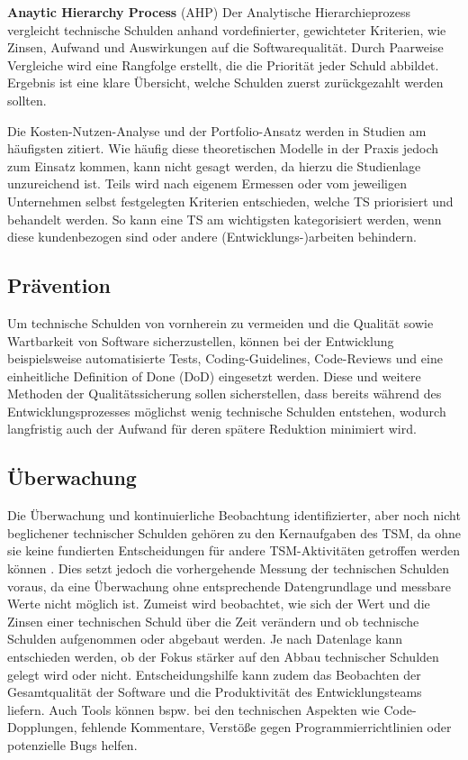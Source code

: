 \documentclass[acmtog]{acmart}
\begin{document}
\textbf{Anaytic Hierarchy Process} (AHP)
Der Analytische Hierarchieprozess vergleicht technische Schulden anhand
vordefinierter, gewichteter Kriterien, wie Zinsen, Aufwand und Auswirkungen
auf die Softwarequalität. Durch Paarweise Vergleiche wird eine Rangfolge
erstellt, die die Priorität jeder Schuld abbildet. Ergebnis ist eine klare
Übersicht, welche Schulden zuerst zurückgezahlt werden sollten. \cite{Seaman12, Alves16}


Die Kosten-Nutzen-Analyse und der Portfolio-Ansatz werden in Studien am
häufigsten zitiert. Wie häufig diese theoretischen Modelle in der Praxis jedoch
zum Einsatz kommen, kann nicht gesagt werden, da hierzu die Studienlage
unzureichend ist. \cite{Seaman12} Teils wird nach eigenem Ermessen oder vom
jeweiligen Unternehmen selbst festgelegten Kriterien entschieden, welche TS
priorisiert und behandelt werden. So kann eine TS am wichtigsten kategorisiert
werden, wenn diese kundenbezogen sind oder andere (Entwicklungs-)arbeiten
behindern. \cite{Codabux13}

\subsection{Prävention}\label{sec:TSM_Prävention}
Um technische Schulden von vornherein zu vermeiden und die Qualität sowie
Wartbarkeit von Software sicherzustellen, können bei der Entwicklung
beispielsweise automatisierte Tests, Coding-Guidelines, Code-Reviews und
eine einheitliche Definition of Done (DoD) eingesetzt werden. Diese und
weitere Methoden der Qualitätssicherung sollen sicherstellen, dass bereits
während des Entwicklungsprozesses möglichst wenig technische Schulden
entstehen, wodurch langfristig auch der Aufwand für deren spätere Reduktion
minimiert wird. \cite{Behutiye17, Holvitie18, Alves16}

\subsection{Überwachung}\label{sec:TSM_Überwachung}
Die Überwachung und kontinuierliche Beobachtung identifizierter, aber noch
nicht beglichener technischer Schulden gehören zu den Kernaufgaben des TSM,
da ohne sie keine fundierten Entscheidungen für andere TSM-Aktivitäten getroffen
werden können \cite{Ernst15}. Dies setzt jedoch die vorhergehende Messung der
technischen Schulden voraus, da eine Überwachung ohne entsprechende Datengrundlage
und messbare Werte nicht möglich ist. \cite{Alves16} Zumeist wird beobachtet,
wie sich der Wert und die Zinsen einer technischen Schuld über die Zeit verändern
und ob technische Schulden aufgenommen oder abgebaut werden. Je nach Datenlage
kann entschieden werden, ob der Fokus stärker auf den Abbau technischer Schulden
gelegt wird oder nicht. Entscheidungshilfe kann zudem das Beobachten der
Gesamtqualität der Software und die Produktivität des Entwicklungsteams liefern.
Auch Tools können bspw. bei den technischen Aspekten wie Code-Dopplungen,
fehlende Kommentare, Verstöße gegen Programmierrichtlinien oder potenzielle
Bugs helfen. \cite{Ylihuumo16, Alves16}
\end{document}
